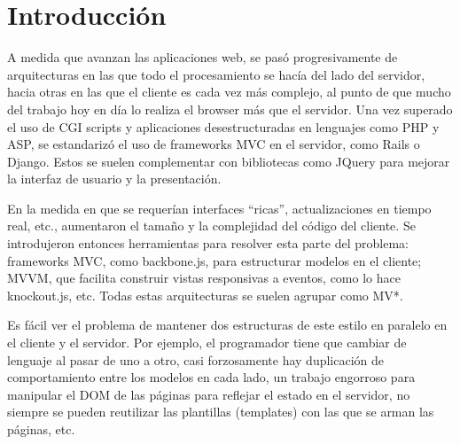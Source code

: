 \documentclass[doc,helv,longtable]{article}
\begin{document}


\setcounter{page}{1}

\tableofcontents
\newpage



\clearpage  

\setlength{\parindent}{0pt}
\setlength{\parskip}{2ex plus 0.5ex minus 0.2ex}

\hypersetup{
linkcolor=red
}

\section{Introducción}

A medida que avanzan las aplicaciones web, se pasó progresivamente de arquitecturas en las que todo el procesamiento se hacía del lado del servidor, hacia otras en las que el cliente es cada vez más complejo, al punto de que mucho del trabajo hoy en día lo realiza el browser más que el servidor\cite{jsmvcvs}. Una vez superado el uso de CGI scripts y aplicaciones desestructuradas en lenguajes como PHP y ASP, se estandarizó el uso de frameworks MVC en el servidor, como Rails o Django. Estos se suelen complementar con bibliotecas como JQuery para mejorar la interfaz de usuario y la presentación. 

En la medida en que se requerían interfaces “ricas”\cite{rich}, actualizaciones en tiempo real, etc., aumentaron el tamaño y la complejidad del código del cliente. Se introdujeron entonces herramientas para resolver esta parte del problema\cite{richjs}: frameworks MVC, como backbone.js\cite{backbone}, para estructurar modelos en el cliente; MVVM, que facilita construir vistas responsivas a eventos, como lo hace knockout.js\cite{knockout}, etc. Todas estas arquitecturas se suelen agrupar como MV*\cite{mvw}.

Es fácil ver el problema de mantener dos estructuras de este estilo en paralelo en el cliente y el servidor. Por ejemplo, el programador tiene que cambiar de lenguaje al pasar de uno a otro, casi forzosamente hay duplicación de comportamiento entre los modelos en cada lado, un trabajo engorroso para manipular el DOM de las páginas para reflejar el estado en el servidor, no siempre se pueden reutilizar las plantillas (templates) con las que se arman las páginas, etc.\cite{wdsucks}
\end{document}
